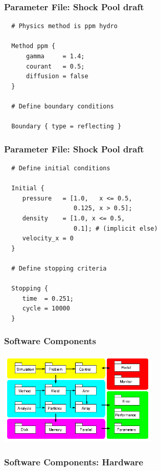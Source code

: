\documentclass{beamer}
\begin{document}
    \begin{frame}[fragile] \frametitle{Parameter File: Shock Pool draft}
 \footnotesize
      \begin{verbatim}
  # Physics method is ppm hydro
 
  Method ppm {
      gamma     = 1.4;
      courant   = 0.5;
      diffusion = false
  }
 
  # Define boundary conditions
 
  Boundary { type = reflecting }
      \end{verbatim}
\end{frame}

    \begin{frame}[fragile] \frametitle{Parameter File: Shock Pool draft}
 \footnotesize
      \begin{verbatim}
  # Define initial conditions
 
  Initial {
     pressure   = [1.0,   x <= 0.5,
                   0.125, x > 0.5];
     density    = [1.0, x <= 0.5,
                   0.1]; # (implicit else)
     velocity_x = 0
  }
 
  # Define stopping criteria
 
  Stopping {
     time  = 0.251;
     cycle = 10000
  }
      \end{verbatim}
\end{frame}

    \begin{frame}[fragile] \frametitle{Software Components}
\centerline{\includegraphics[width=3in]{components.png}}
\end{frame}

    \begin{frame}[fragile] \frametitle{Software Components: Hardware}
\end{frame}
\end{document}
